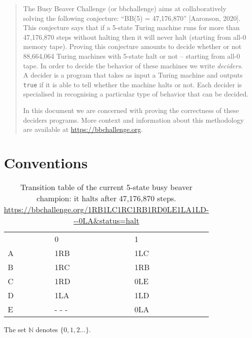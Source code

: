\documentclass[a4paper,british]{article}
\theoremstyle{definition} %
\numberwithin{equation}{section}
\theoremstyle{remark} %
\begin{document}
\date{}
\maketitle

\begin{abstract}
  The Busy Beaver Challenge (or bbchallenge) aims at collaboratively solving the following conjecture: ``BB(5) = 47,176,870'' [Aaronson, 2020]\nocite{BusyBeaverFrontier}. This conjecture says that if a 5-state Turing machine runs for more than 47,176,870 steps without halting then it will never halt (starting from all-0 memory tape). Proving this conjecture amounts to decide whether or not 88,664,064 Turing machines with 5-state halt or not -- starting from all-0 tape. In order to decide the behavior of these machines we write \textit{deciders}. A decider is a program that takes as input a Turing machine and outputs \texttt{true} if it is able to tell whether the machine halts or not. Each decider is specialised in recognising a particular type of behavior that can be decided.

  In this document we are concerned with proving the correctness of these deciders programs. More context and information about this methodology are available at \url{https://bbchallenge.org}.
\end{abstract}
\tableofcontents

\section{Conventions}\label{sec:conventions}

\begin{table}[h!]
  \centering
  \begin{tabular}{lll}
      & 0     & 1   \\
    A & 1RB   & 1LC \\
    B & 1RC   & 1RB \\
    C & 1RD   & 0LE \\
    D & 1LA   & 1LD \\
    E & - - - & 0LA
  \end{tabular}
  \caption{Transition table of the current 5-state busy beaver champion: it halts after 47,176,870 steps.\\\url{https://bbchallenge.org/1RB1LC1RC1RB1RD0LE1LA1LD---0LA&status=halt}}
\end{table}\label{table:bb5}

The set $\mathbb{N}$ denotes $\{0,1,2\dots\}$.
\end{document}
